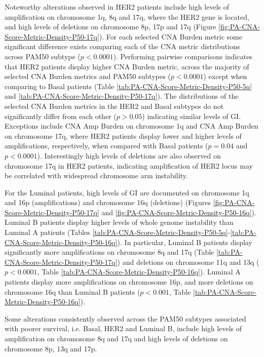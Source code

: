 Noteworthy alterations observed in HER2 patients include high levels of amplification on chromosome 1q, 8q and 17q, where the HER2 gene is located, and high levels of deletions on chromosome 8p, 17p and 17q (Figure \ref{fig:PA-CNA-Score-Metric-Density-P50-17q}). For each selected CNA Burden metric some significant difference exists comparing each of the CNA metric distributions across PAM50 subtype ($p<0.0001$). Performing pairwise comparisons indicates that HER2 patients display higher CNA Burden metric, across the majority of selected CNA Burden metrics and PAM50 subtypes ($p<0.0001$) except when comparing to Basal patients (Table \ref{tab:PA-CNA-Score-Metric-Density-P50-5q} and \ref{tab:PA-CNA-Score-Metric-Density-P50-17q}). The distributions of the selected CNA Burden metrics in the HER2 and Basal subtypes do not significantly differ from each other ($p>0.05$) indicating similar levels of GI. Exceptions include CNA Amp Burden on chromosome 1q and CNA Amp Burden on chromosome 17q, where HER2 patients display lower and higher levels of amplifications, respectively, when compared with Basal patients ($p = 0.04$ and  $p<0.0001$). Interestingly high levels of deletions are also observed on chromosome 17q in HER2 patients, indicating amplification of HER2 locus may be correlated with widespread chromosome arm instability. 

For the Luminal patients, high levels of GI are documented on chromosome 1q and 16p (amplifications) and chromosome 16q (deletions) (Figures \ref{fig:PA-CNA-Score-Metric-Density-P50-17q} and \ref{fig:PA-CNA-Score-Metric-Density-P50-16q}). Luminal B patients display higher levels of whole genome instability than Luminal A patients (Tables \ref{tab:PA-CNA-Score-Metric-Density-P50-5q}-\ref{tab:PA-CNA-Score-Metric-Density-P50-16q}). In particular, Luminal B patients display significantly more amplifications on chromosome 8q and 17q (Table \ref{tab:PA-CNA-Score-Metric-Density-P50-17q}) and deletions on chromosome 11q and 13q ($p < 0.0001$, Table \ref{tab:PA-CNA-Score-Metric-Density-P50-16q}). Luminal A patients display more amplifications on chromosome 16p, and more deletions on chromosome 16q than Luminal B patients ($p<0.001$, Table \ref{tab:PA-CNA-Score-Metric-Density-P50-16q}). 

Some alterations consistently observed across the PAM50 subtypes associated with poorer survival, i.e. Basal, HER2 and Luminal B, include high levels of amplification on chromosome 8q and 17q and high levels of deletions on chromosome 8p, 13q and 17p. 

